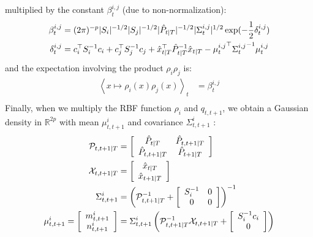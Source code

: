 multiplied by the constant $\beta^{i,j}_t$ (due to non-normalization):
\begin{align*}
  \beta^{i,j}_t &= (2\pi)^{-p} |S_i|^{-1/2} |S_j|^{-1/2} |\hat{P}_{t|T}|^{-1/2} |\Sigma^{i,j}_t|^{1/2} \exp(-\frac{1}{2} \delta^{i,j}_t)\\
  \delta^{i,j}_t &= c_i^{\top} S_i^{-1} c_i + c_j^{\top} S_j^{-1} c_j + \hat{x}_{t \mathbin{\vert} T}^{\top} \hat{P}_{t \mathbin{\vert} T}^{-1} \hat{x}_{t \mathbin{\vert} T} - {\mu^{i,j}_t}^{\top} {\Sigma^{i,j}_t}^{-1} \mu^{i,j}_t\\
\end{align*}
and the expectation involving the product $\rho_i \rho_j$ is:
\begin{align*}
  \left< x \mapsto \rho_i(x)\rho_j(x)\right>_{t} &= \beta^{i,j}_t\\
\end{align*}
Finally, when we multiply the RBF function $\rho_i$ and $q_{t,t+1}$, we obtain a Gaussian density in $\mathbb{R}^{2p}$ with mean $\mu^i_{t,t+1}$ and covariance $\Sigma^i_{t,t+1}$ :
\begin{align*}
  \mathcal{P}_{t,t+1 \mathbin{\vert} T} &= 
    \left[
      \begin{array}{cc} \hat{P}_{t \mathbin{\vert} T} & \hat{P}_{t,t+1 \mathbin{\vert} T}\\ \hat{P}_{t,t+1 \mathbin{\vert} T} & \hat{P}_{t+1 \mathbin{\vert} T} \end{array}
    \right]
  \\
  \mathcal{X}_{t,t+1 \mathbin{\vert} T} &=
    \left[
      \begin{array}{c} \hat{x}_{t \mathbin{\vert} T} \\ \hat{x}_{t+1 \mathbin{\vert} T} \end{array}
    \right]
  \\
  \Sigma^i_{t,t+1} &=
    \left(
      \mathcal{P}_{t,t+1 \mathbin{\vert} T}^{-1}
       +
      \left[
        \begin{array}{cc} S_i^{-1} & 0\\ 0 & 0 \end{array}
      \right]
    \right)^{-1}
  \\
  \mu^i_{t,t+1} =
    \left[
      \begin{array}{c} m^i_{t,t+1} \\ n^i_{t,t+1} \end{array}
    \right]
    &=
    \Sigma^i_{t,t+1}
      \left(
        \mathcal{P}_{t,t+1 \mathbin{\vert} T}^{-1} \mathcal{X}_{t,t+1 \mathbin{\vert} T}
        +
        \left[
          \begin{array}{c} S_i^{-1}c_i \\ 0 \end{array}
        \right]
      \right)
  \\
\end{align*}
